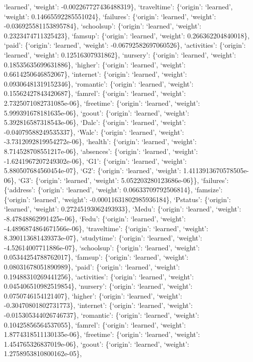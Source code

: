 \documentclass[
]{article}
\begin{document}
`learned', `weight': -0.002267727436488319\}, `traveltime': \{`origin':
`learned', `weight': 0.14665592285551024\}, `failures': \{`origin':
`learned', `weight': -0.036925581153895784\}, `schoolsup': \{`origin':
`learned', `weight': 0.2323474711325423\}, `famsup': \{`origin':
`learned', `weight': 0.266362204840018\}, `paid': \{`origin': `learned',
`weight': -0.06792582697060526\}, `activities': \{`origin': `learned',
`weight': 0.12516307931862\}, `nursery': \{`origin': `learned',
`weight': 0.18535635699631886\}, `higher': \{`origin': `learned',
`weight': 0.6614250646852067\}, `internet': \{`origin': `learned',
`weight': 0.09306481319152346\}, `romantic': \{`origin': `learned',
`weight': 0.15562427843420687\}, `famrel': \{`origin': `learned',
`weight': 2.7325071082731085e-06\}, `freetime': \{`origin': `learned',
`weight': 5.999391678181635e-06\}, `goout': \{`origin': `learned',
`weight': 5.392816587318543e-06\}, `Dalc': \{`origin': `learned',
`weight': -0.04079588249535337\}, `Walc': \{`origin': `learned',
`weight': -3.7312092819954272e-06\}, `health': \{`origin': `learned',
`weight': 8.714528708551217e-06\}, `absences': \{`origin': `learned',
`weight': -1.6241967207249302e-06\}, `G1': \{`origin': `learned',
`weight': 5.880507684560454e-07\}, `G2': \{`origin': `learned',
`weight': 1.4113913670578505e-06\}, `G3': \{`origin': `learned',
`weight': 5.052203280123686e-06\}\}, `failures': \{`address':
\{`origin': `learned', `weight': 0.06633709792506814\}, `famsize':
\{`origin': `learned', `weight': -0.00011631802985936184\}, `Pstatus':
\{`origin': `learned', `weight': 0.27245193062493933\}, `Medu':
\{`origin': `learned', `weight': -8.47848862991425e-06\}, `Fedu':
\{`origin': `learned', `weight': -4.4896874864671566e-06\},
`traveltime': \{`origin': `learned', `weight': 8.390113681439373e-07\},
`studytime': \{`origin': `learned', `weight': -4.52614007711886e-07\},
`schoolsup': \{`origin': `learned', `weight': 0.05344254788762017\},
`famsup': \{`origin': `learned', `weight': 0.08031678051890989\},
`paid': \{`origin': `learned', `weight': 0.19488310269441256\},
`activities': \{`origin': `learned', `weight': 0.045406510982519854\},
`nursery': \{`origin': `learned', `weight': 0.0750746154121407\},
`higher': \{`origin': `learned', `weight': -0.30470801802731773\},
`internet': \{`origin': `learned', `weight': -0.015305344026746737\},
`romantic': \{`origin': `learned', `weight': 0.10425856564537055\},
`famrel': \{`origin': `learned', `weight': 1.8774318511130135e-06\},
`freetime': \{`origin': `learned', `weight': 1.454765326837019e-06\},
`goout': \{`origin': `learned', `weight': 1.2758953810800162e-05\},
\end{document}
